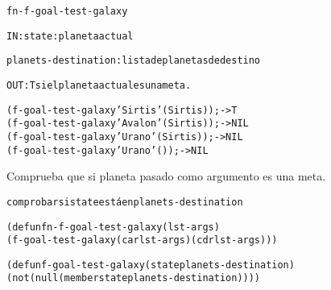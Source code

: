 \begin{aibox}{\function}
\begin{alltt}
fn-f-goal-test-galaxy

 IN: 	state: planeta actual

 		planets-destination: lista de planetas de destino

 OUT: T si el planeta actual es una meta.

\end{alltt}
\end{aibox}

\begin{aibox}{\examples}
\begin{alltt}
(f-goal-test-galaxy 'Sirtis '(Sirtis)) ;-> T 
(f-goal-test-galaxy 'Avalon '(Sirtis)) ;-> NIL 
(f-goal-test-galaxy 'Urano '(Sirtis)) ;-> NIL
(f-goal-test-galaxy 'Urano '()) ;-> NIL
\end{alltt}
\end{aibox}

\begin{aibox}{\comments}
Comprueba que si planeta pasado como argumento es una meta.
\end{aibox}

\begin{aibox}{\pseudocode}
\begin{alltt}
 comprobar si state está en planets-destination
\end{alltt}
\end{aibox}

\begin{aibox}{\code}
\begin{alltt}
(defun fn-f-goal-test-galaxy (lst-args)
	(f-goal-test-galaxy (car lst-args) (cdr lst-args)))

(defun f-goal-test-galaxy (state planets-destination) 
  (not (null (member state planets-destination))))

\end{alltt}
\end{aibox}
